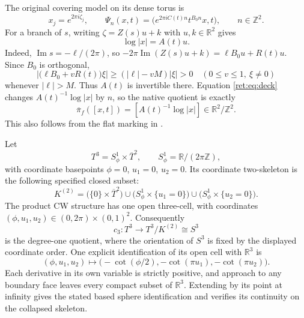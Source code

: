 \documentclass[11pt,letterpaper]{article}
\numberwithin{equation}{section}
\theoremstyle{definition}
\theoremstyle{remark}
\begin{document}
The original covering model on its dense torus is
\begin{equation}
 x_j=e^{2\pi i\zeta_j},\qquad
 \Psi_n(x,t)=
 \bigl(e^{2\pi i C(t)n}t^{B_0n}x,t\bigr),\qquad n\in\mathbb Z^2.
 \label{ret:eq:deck}
\end{equation}
For a branch of \(s\), writing
\(\zeta=Z(s)u+k\) with \(u,k\in\mathbb R^2\) gives
\begin{equation}
 \log|x|=A(t)u.
 \label{ret:eq:logx}
\end{equation}
Indeed, \(\operatorname{Im}s=-\ell/(2\pi)\), so
\(-2\pi\operatorname{Im}(Z(s)u+k)=\ell B_0u+R(t)u\).
Since \(B_0\) is orthogonal,
\begin{equation}
 \bigl|\bigl(\ell B_0+vR(t)\bigr)\xi\bigr|
 \geq (|\ell|-vM)|\xi|>0
 \quad(0\leq v\leq1,\ \xi\ne0)
 \label{ret:eq:invertibility}
\end{equation}
whenever \(|\ell|>M\).  Thus \(A(t)\) is invertible there.  Equation
\eqref{ret:eq:deck} changes \(A(t)^{-1}\log|x|\) by \(n\), so the native
quotient is exactly
\begin{equation}
 \overline\pi_f([x,t])=[A(t)^{-1}\log|x|]\in\mathbb R^2/\mathbb Z^2.
 \label{ret:eq:native}
\end{equation}
This also follows from the flat marking in \cite{retbib:ConeRoutes}.

Let
\[
 T^3=S^1_\phi\times\overline T^2,
 \qquad S^1_\phi=\mathbb R/(2\pi\mathbb Z),
\]
with coordinate basepoints \(\phi=0\), \(u_1=0\), \(u_2=0\).
Its coordinate two-skeleton is the following specified closed subset:
\begin{equation}
 K^{(2)}=
 \bigl(\{0\}\times\overline T^2\bigr)
 \cup\bigl(S^1_\phi\times\{u_1=0\}\bigr)
 \cup\bigl(S^1_\phi\times\{u_2=0\}\bigr).
 \label{ret:eq:two-skeleton}
\end{equation}
The product CW structure has one open three-cell, with coordinates
\((\phi,u_1,u_2)\in(0,2\pi)\times(0,1)^2\).  Consequently
\[
 c_3:T^3\longrightarrow T^3/K^{(2)}\cong S^3
\]
is the degree-one quotient, where the orientation of \(S^3\) is fixed
by the displayed coordinate order.  One explicit identification of its
open cell with \(\mathbb R^3\) is
\[
 (\phi,u_1,u_2)\longmapsto
 \bigl(-\cot(\phi/2),-\cot(\pi u_1),-\cot(\pi u_2)\bigr).
\]
Each derivative in its own variable is strictly positive, and approach
to any boundary face leaves every compact subset of \(\mathbb R^3\).
Extending by its point at infinity gives the stated based sphere
identification and verifies its continuity on the collapsed skeleton.
\end{document}
